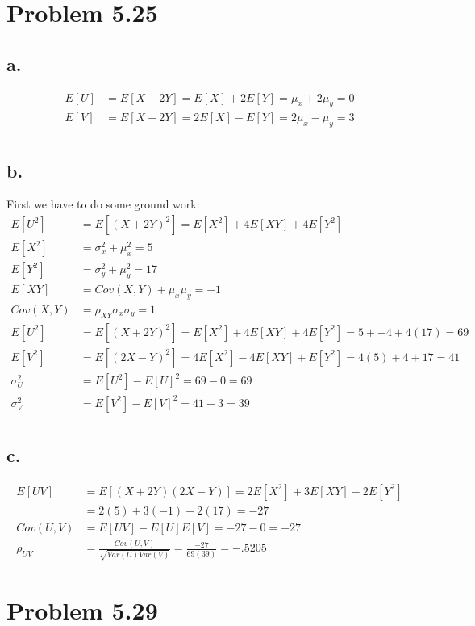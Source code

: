 \documentclass[12pt]{article}
\begin{document}
\section*{Problem 5.25}
\subsection*{a.}
\begin{align*}
  E[U] &= E[X+2Y] = E[X] + 2E[Y] = \mu_x + 2\mu_y = 0 \\
  E[V] &= E[X+2Y] = 2E[X] - E[Y] = 2\mu_x - \mu_y = 3 \\
\end{align*}

\subsection*{b.}
First we have to do some ground work:
\begin{align*}
  E[U^2] &= E[(X+2Y)^2] = E[X^2] + 4E[XY] + 4E[Y^2] \\
  E[X^2] &= \sigma_x^2 + \mu_x^2 = 5 \\
  E[Y^2] &= \sigma_y^2 + \mu_y^2 = 17 \\
  E[XY] &= Cov(X,Y) + \mu_x \mu_y = -1 \\
  Cov(X,Y) &= \rho_{XY}\sigma_x \sigma_y = 1 \\
  E[U^2] &= E[(X+2Y)^2] = E[X^2] + 4E[XY] + 4E[Y^2] = 5 + -4 + 4(17) = 69 \\
  E[V^2] &= E[(2X-Y)^2] = 4E[X^2] -4E[XY] + E[Y^2] = 4(5) + 4 + 17 = 41 \\
  \sigma_U^2 &= E[U^2] - E[U]^2 = 69 - 0 = 69 \\ 
  \sigma_V^2 &= E[V^2] - E[V]^2 = 41 - 3 = 39 \\ 
\end{align*}

\subsection{c.}
\begin{align*}
  E[UV] &= E[(X+2Y)(2X-Y)] = 2E[X^2] + 3E[XY] - 2E[Y^2] \\
  &= 2(5) + 3(-1) - 2(17) = -27 \\
  Cov(U,V) &= E[UV] - E[U]E[V] = -27 - 0 = -27 \\
  \rho_{UV} &= \frac{Cov(U,V)}{\sqrt{Var(U)Var(V)}} = \frac{-27}{69(39)} = -.5205
\end{align*}

\section{Problem 5.29}
\end{document}
